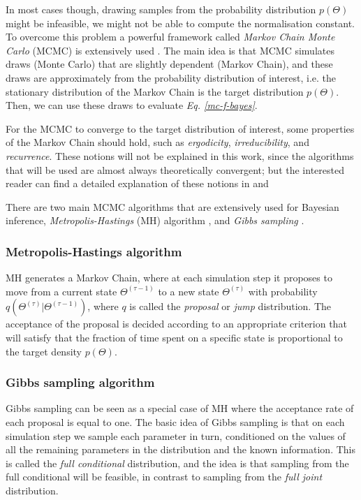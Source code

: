 In most cases though, drawing samples from the probability distribution $p(\Theta)$ might be infeasible, \eg we might not be able to compute the normalisation constant. To overcome this problem a powerful framework called \emph{Markov Chain Monte Carlo} (MCMC) is extensively used \citep{Neal1998}. The main idea is that MCMC simulates draws (\ie Monte Carlo) that are slightly dependent (\ie Markov Chain), and these draws are approximately from the probability distribution of interest, i.e. the stationary distribution of the Markov Chain is the target distribution $p(\Theta)$. Then, we can use these draws to evaluate \emph{Eq. \ref{mc-f-bayes}}.

For the MCMC to converge to the target distribution of interest, some properties of the Markov Chain should hold, such as \emph{ergodicity}, \emph{irreducibility}, and \emph{recurrence}. These notions will not be explained in this work, since the algorithms that will be used are almost always theoretically convergent; but the interested reader can find a detailed explanation of these notions in \citet{Robert1999} and \citet{Liu2001}

There are two main MCMC algorithms that are extensively used for Bayesian inference, \emph{Metropolis-Hastings} (MH) algorithm \citep{Metropolis1953, Hastings1970}, and \emph{Gibbs sampling} \citep{Geman1984, Gelfand1990}. 

\subsubsection*{Metropolis-Hastings algorithm}
MH generates a Markov Chain, where at each simulation step it proposes to move from a current state $\Theta^{(\tau-1)}$ to a new state $\Theta^{(\tau)}$ with probability $q(\Theta^{(\tau)}|\Theta^{(\tau -1)})$, where $q$ is called the \emph{proposal} or \emph{jump} distribution. The acceptance of the proposal is decided according to an appropriate criterion that will satisfy that the fraction of time spent on a specific state is proportional to the target density $p(\Theta)$.

\subsubsection*{Gibbs sampling algorithm}
Gibbs sampling can be seen as a special case of MH where the acceptance rate of each proposal is equal to one. The basic idea of Gibbs sampling is that on each simulation step we sample each parameter in turn, conditioned on the values of all the remaining parameters in the distribution and the known information. This is called the \emph{full conditional} distribution, and the idea is that sampling from the full conditional will be feasible, in contrast to sampling from the \emph{full joint} distribution.

